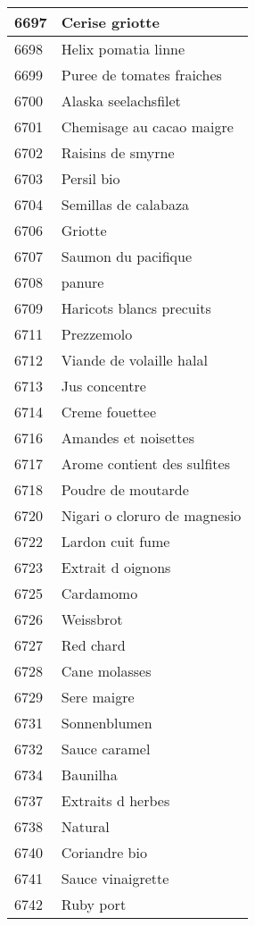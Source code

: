 \begin{longtable}{|l|l|}
6697 & Cerise griotte \\ \hline 
6698 & Helix pomatia linne \\ \hline 
6699 & Puree de tomates fraiches \\ \hline 
6700 & Alaska seelachsfilet \\ \hline 
6701 & Chemisage au cacao maigre \\ \hline 
6702 & Raisins de smyrne \\ \hline 
6703 & Persil bio \\ \hline 
6704 & Semillas de calabaza \\ \hline 
6706 & Griotte \\ \hline 
6707 & Saumon du pacifique \\ \hline 
6708 & panure \\ \hline 
6709 & Haricots blancs precuits \\ \hline 
6711 & Prezzemolo \\ \hline 
6712 & Viande de volaille halal \\ \hline 
6713 & Jus concentre \\ \hline 
6714 & Creme fouettee \\ \hline 
6716 & Amandes et noisettes \\ \hline 
6717 & Arome contient des sulfites \\ \hline 
6718 & Poudre de moutarde \\ \hline 
6720 & Nigari o cloruro de magnesio \\ \hline 
6722 & Lardon cuit fume \\ \hline 
6723 & Extrait d oignons \\ \hline 
6725 & Cardamomo \\ \hline 
6726 & Weissbrot \\ \hline 
6727 & Red chard \\ \hline 
6728 & Cane molasses \\ \hline 
6729 & Sere maigre \\ \hline 
6731 & Sonnenblumen \\ \hline 
6732 & Sauce caramel \\ \hline 
6734 & Baunilha \\ \hline 
6737 & Extraits d herbes \\ \hline 
6738 & Natural \\ \hline 
6740 & Coriandre bio \\ \hline 
6741 & Sauce vinaigrette \\ \hline 
6742 & Ruby port \\ \hline 

\end{longtable}
